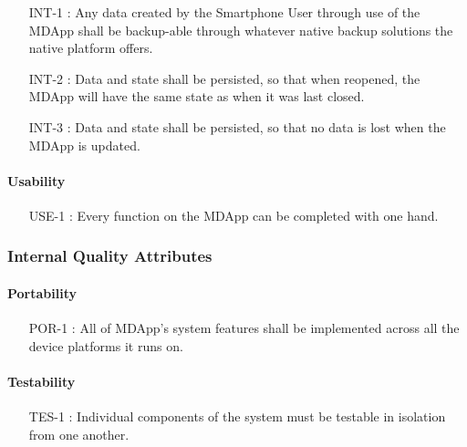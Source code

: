                 \begin{itemize}[leftmargin=1.4cm]
                    \item[INT-1 :] Any data created by the Smartphone User through use of the MDApp shall be backup-able through whatever native backup solutions the native platform offers.
                    \item[INT-2 :] Data and state shall be persisted, so that when reopened, the MDApp will have the same state as when it was last closed.
                    \item[INT-3 :] Data and state shall be persisted, so that no data is lost when the MDApp is updated.
                \end{itemize}

            \paragraph{Usability}

                \begin{itemize}[leftmargin=1.4cm]
                    \item[USE-1 :] Every function on the MDApp can be completed with one hand.
                \end{itemize}

        \subsubsection{Internal Quality Attributes}

            \paragraph{Portability}

                \begin{itemize}[leftmargin=1.4cm]
                    \item[POR-1 :] All of MDApp's system features shall be implemented across all the device platforms it runs on.
                \end{itemize}

            \paragraph{Testability}

                \begin{itemize}[leftmargin=1.4cm]
                    \item[TES-1 :] Individual components of the system must be testable in isolation from one another.
                \end{itemize}

